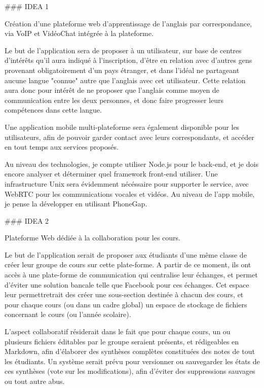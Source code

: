 ### IDEA 1

Création d'une plateforme web d'apprentissage de l'anglais par correspondance, via VoIP et VidéoChat intégrée à la plateforme.

Le but de l'application sera de proposer à un utilisateur, sur base de centres d'intérêts qu'il aura indiqué à l'inscription, d'être en relation
avec d'autres gens provenant obligatoirement d'un pays étranger, et dans l'idéal ne partageant aucune langue "connue" autre que l'anglais avec cet utilisateur.
Cette relation aura donc pour intérêt de ne proposer que l'anglais comme moyen de communication entre les deux personnes, et donc faire progresser 
leurs compétences dans cette langue.

Une application mobile multi-plateforme sera également disponible pour les utilisateurs, afin de pouvoir garder contact avec leurs correspondants, 
et accéder en tout temps aux services proposés.

Au niveau des technologies, je compte utiliser Node.js pour le back-end, et je dois encore analyser et déterminer quel framework front-end utiliser.
Une infrastructure Unix sera évidemment nécéssaire pour supporter le service, avec WebRTC pour les communications vocales et vidéos.
Au niveau de l'app mobile, je pense la développer en utilisant PhoneGap.

### IDEA 2 

Plateforme Web dédiée à la collaboration pour les cours.

Le but de l'application serait de proposer aux étudiants d'une même classe de créer leur groupe de cours sur cette plate-forme.
A partir de ce moment, ils ont accès à une plate-forme de communication qui centralise leur échanges, et permet d'éviter une solution bancale telle que Facebook pour ces échanges.
Cet espace leur permettretrait des créer une sous-section destinée à chacun des cours, et pour chaque cours (ou dans un cadre global) un espace de stockage de fichiers concernant le cours (ou l'année scolaire).

L'aspect collaboratif résiderait dans le fait que pour chaque cours, un ou plusieurs fichiers éditables par le groupe seraient présents, et rédigeables en Markdown, afin d'élaborer des synthèses complètes constituées des notes de tout les étudiants.
Un système serait prévu pour versionner ou sauvegarder les états de ces synthèses (vote sur les modifications), afin d'éviter des suppressions sauvages ou tout autre abus.